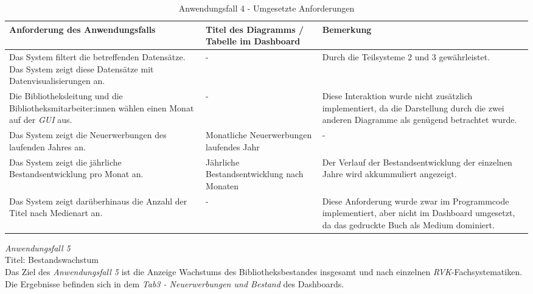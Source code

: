 \begingroup
    \setlength{\tabcolsep}{12pt} %
    \renewcommand{\arraystretch}{1.5} 
    \begin{table}[H]
        \centering
        \begin{adjustbox}{max width=\textwidth}
        \begin{tabular}{p{}p{}p{}}
           \toprule
           Anforderung des Anwendungsfalls        &Titel des Diagramms / Tabelle im Dashboard &Bemerkung\\
           \midrule
           Das System filtert die betreffenden Datensätze. Das System zeigt diese Datensätze mit Datenvisualisierungen an.&-&Durch die Teilsysteme 2  und 3 gewährleistet.\\
           Die Bibliotheksleitung und die Bibliotheksmitarbeiter:innen wählen einen Monat auf der \textit{\acrshort{GUI}} aus.&-&Diese Interaktion wurde nicht zusätzlich implementiert, da die Darstellung durch die zwei anderen Diagramme als genügend betrachtet wurde.\\
           Das System zeigt die Neuerwerbungen des laufenden Jahres an.&Monatliche Neuerwerbungen laufendes Jahr&-\\
           Das System zeigt die jährliche Bestandsentwicklung pro Monat an.&Jährliche Bestandsentwicklung nach Monaten&Der Verlauf der Bestandsentwicklung der einzelnen Jahre wird akkummuliert angezeigt.\\
           Das System zeigt darüberhinaus die Anzahl der Titel nach Medienart an.&-&Diese Anforderung wurde zwar im Programmcode implementiert, aber nicht im Dashboard umgesetzt, da das gedruckte Buch als Medium dominiert.\\

        \bottomrule
        \end{tabular}
        \end{adjustbox}
        \caption{%
            Anwendungsfall 4 - Umgesetzte Anforderungen
        }
        \label{tab:Anwendungsfall 4 - Umgesetzte Anforderungen}
        \end{table}

\clearpage
\noindent
\textit{Anwendungsfall 5}\\
Titel: Bestandswachstum\\
Das Ziel des \textit{Anwendungsfall 5} ist die Anzeige Wachstums des Bibliotheksbestandes insgesamt und nach einzelnen \textit{\acrshort{RVK}}-Fachsystematiken.
Die Ergebnisse befinden sich in dem \textit{Tab3 - Neuerwerbungen und Bestand} des Dashboards.

